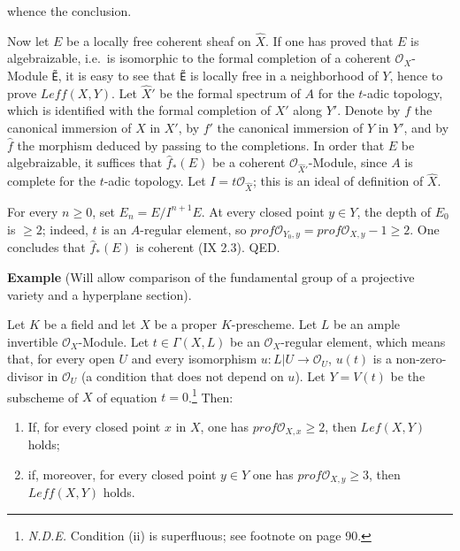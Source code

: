 \documentclass[
  11pt,
  a4paper,
]{book}
\providecommand{\tightlist}{%
  \setlength{\itemsep}{0pt}\setlength{\parskip}{0pt}}
\begin{document}
whence the conclusion.

Now let \(E\) be a locally free coherent sheaf on \(\hat{X}\). If one
has proved that \(E\) is algebraizable, i.e.~is isomorphic to the formal
completion of a coherent \(\mathcal{O}_{X}\)-Module \texttt{Ẽ}, it is
easy to see that \texttt{Ẽ} is locally free in a neighborhood of \(Y\),
hence to prove \(Leff(X, Y)\). Let \(\hat{X}'\) be the formal spectrum
of \(A\) for the \(t\)-adic topology, which is identified with the
formal completion of \(X'\) along \(Y'\). Denote by \(f\) the canonical
immersion of \(X\) in \(X'\), by \(f'\) the canonical immersion of \(Y\)
in \(Y'\), and by \(\hat{f}\) the morphism deduced by passing to the
completions. In order that \(E\) be algebraizable, it suffices that
\(\hat{f}_{*}(E)\) be a coherent \(\mathcal{O}_{\hat{X}'}\)-Module,
since \(A\) is complete for the \(t\)-adic topology. Let
\(I = t\mathcal{O}_{\hat{X}}\); this is an ideal of definition of
\(\hat{X}\).

For every \(n \geqslant 0\), set \(E_{n} = E/I^{n+1}E\). At every closed
point \(y \in Y\), the depth of \(E_{0}\) is \(\geqslant
2\); indeed, \(t\) is an \(A\)-regular element, so
\(prof \mathcal{O}_{Y_{0},y} = prof \mathcal{O}_{X,y} - 1 \geqslant 2\).
One concludes that \(\hat{f}_{*}(E)\) is coherent (IX 2.3). QED.

\textbf{Example} (Will allow comparison of the fundamental group of a
projective variety and a hyperplane section).

Let \(K\) be a field and let \(X\) be a proper \(K\)-prescheme. Let
\(L\) be an ample invertible \(\mathcal{O}_{X}\)-Module. Let
\(t \in \Gamma(X, L)\) be an \(\mathcal{O}_{X}\)-regular element, which
means that, for every open \(U\) and every isomorphism
\(u: L|U \to \mathcal{O}_{U}\), \(u(t)\) is a non-zero-divisor in
\(\mathcal{O}_{U}\) (a condition that does not depend on \(u\)). Let
\(Y = V(t)\) be the subscheme of \(X\) of equation \(t = 0\).\footnote{\emph{N.D.E.}
  Condition (ii) is superfluous; see footnote on page 90.} Then:

\begin{enumerate}
\def\labelenumi{\arabic{enumi}.}
\tightlist
\item
  If, for every closed point \(x\) in \(X\), one has
  \(prof \mathcal{O}_{X,x} \geqslant 2\), then \(Lef(X, Y)\) holds;
\item
  if, moreover, for every closed point \(y \in Y\) one has
  \(prof \mathcal{O}_{X,y} \geqslant 3\), then \(Leff(X, Y)\) holds.
\end{enumerate}
\end{document}
